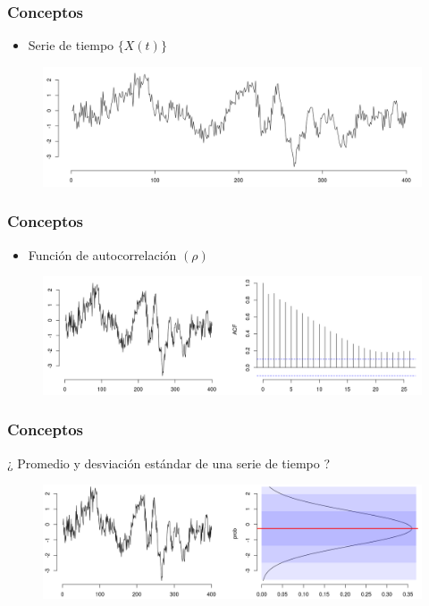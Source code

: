 \documentclass[serif,mathserif,professionalfont]{beamer}
\begin{document}

\begin{frame}\frametitle{Conceptos}
\begin{itemize}
\item Serie de tiempo $\{ X(t) \}$
\end{itemize}
\begin{figure}
\centering
\includegraphics[width=\linewidth]{./curso_scripts/tseries.png}
\end{figure}
\end{frame}


\begin{frame}\frametitle{Conceptos}
\begin{itemize}
\item Función de autocorrelación $(\rho)$
\end{itemize}
\begin{figure}
\centering
\includegraphics[width=\linewidth]{./curso_scripts/acf.png}
\end{figure}
\end{frame}


\begin{frame}\frametitle{Conceptos}
¿ Promedio y desviación estándar de una serie de tiempo ?
\begin{figure}
\centering
\includegraphics[width=\linewidth]{./curso_scripts/mu_x.png}
\end{figure}
\end{frame}
\end{document}
